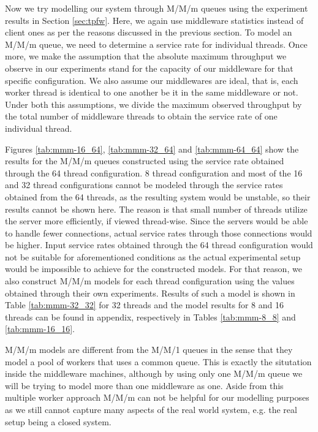 \documentclass[11pt,a4paper]{article}
\begin{document}
Now we try modelling our system through M/M/m queues using the experiment results in Section \ref{sec:tpfw}. Here, we again use middleware statistics instead of client ones as per the reasons discussed in the previous section. To model an M/M/m queue, we need to determine a service rate for individual threads. Once more, we make the assumption that the absolute maximum throughput we observe in our experiments stand for the capacity of our middleware for that specific configuration. We also assume our middlewares are ideal, that is, each worker thread is identical to one another \textemdash be it in the same middleware or not. Under both this assumptions, we divide the maximum observed throughput by the total number of middleware threads to obtain the service rate of one individual thread.
\par Figures \ref{tab:mmm-16_64}, \ref{tab:mmm-32_64} and \ref{tab:mmm-64_64} show the results for the M/M/m queues constructed using the service rate obtained through the 64 thread configuration. 8 thread configuration and most of the 16 and 32 thread configurations cannot be modeled through the service rates obtained from the 64 threads, as the resulting system would be unstable, so their results cannot be shown here. The reason is that small number of threads utilize the server more efficiently, if viewed thread-wise. Since the servers would be able to handle fewer connections, actual service rates through those connections would be higher. Input service rates obtained through the 64 thread configuration would not be suitable for aforementioned conditions as the actual experimental setup would be impossible to achieve for the constructed models. For that reason, we also construct M/M/m models for each thread configuration using the values obtained through their own experiments. Results of such a model is shown in Table \ref{tab:mmm-32_32} for 32 threads and the model results for 8 and 16 threads can be found in appendix, respectively in Tables \ref{tab:mmm-8_8} and \ref{tab:mmm-16_16}.
\par M/M/m models are different from the M/M/1 queues in the sense that they model a pool of workers that uses a common queue. This is exactly the situtation inside the middleware machines, although by using only one M/M/m queue we will be trying to model more than one middleware as one. Aside from this multiple worker approach M/M/m can not be helpful for our modelling purposes as we still cannot capture many aspects of the real world system, e.g. the real setup being a closed system.
\end{document}

